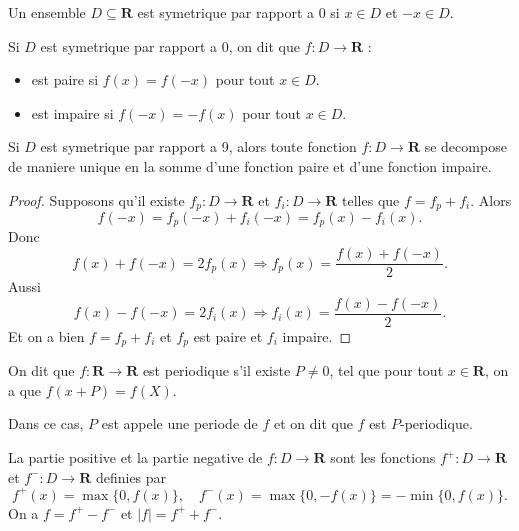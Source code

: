 \begin{definition}
Un ensemble $D\subseteq \mathbf{R}$ est symetrique par rapport a 0 si $x \in D$ et $-x \in D$.
\end{definition}
\begin{definition}
Si $D$ est symetrique par rapport a 0, on dit que $f:D\to \mathbf{R}$ :
\begin{itemize}
\item est paire si $f(x)=f(-x)$ pour tout $x \in D$.
\item est impaire si $f(-x)=-f(x)$ pour tout $x \in D$.
\end{itemize}
\end{definition}
\begin{proposition}
Si $D$ est symetrique par rapport a 9, alors toute fonction $f:D\to \mathbf{R}$ se decompose de maniere unique en la somme d'une fonction paire et d'une fonction impaire.
\end{proposition}
\begin{proof}
Supposons qu'il existe $f_{p}:D\to \mathbf{R}$ et $f_{i}:D\to \mathbf{R}$ telles que $f=f_{p}+f_{i}$. Alors 
$$
f(-x)=f_{p}(-x)+f_{i}(-x)=f_{p}(x)-f_{i}(x).
$$
Donc
$$
f(x)+f(-x)=2f_{p}(x)\Rightarrow f_{p}(x)=\frac{f(x)+f(-x)}{2}.
$$
Aussi
$$
f(x)-f(-x)=2f_{i}(x)\Rightarrow f_{i}(x)=\frac{f(x)-f(-x)}{2}.
$$
Et on a bien $f=f_{p}+f_{i}$ et $f_{p}$ est paire et $f_{i}$ impaire.
\end{proof}
\begin{definition}
On dit que $f:\mathbf{R}\to \mathbf{R}$ est periodique s'il existe $P\neq 0$, tel que pour tout $x \in \mathbf{R}$, on a que $f(x+P)=f(X)$.

Dans ce cas, $P$ est appele une periode de $f$ et on dit que $f$ est $P$-periodique.
\end{definition}
\begin{definition}
La partie positive et la partie negative de $f:D\to \mathbf{R}$ sont les fonctions $f^{+}:D\to \mathbf{R}$ et $f^{-}:D\to \mathbf{R}$ definies par
$$
f^{+}(x)=\max \{ 0,f(x) \},\quad f^{-}(x)=\max \{ 0,-f(x) \}=-\min \{ 0,f(x) \}.
$$
On a $f=f^{+}-f^{-}$ et $|f|=f^{+}+f^{-}$.
\end{definition}
